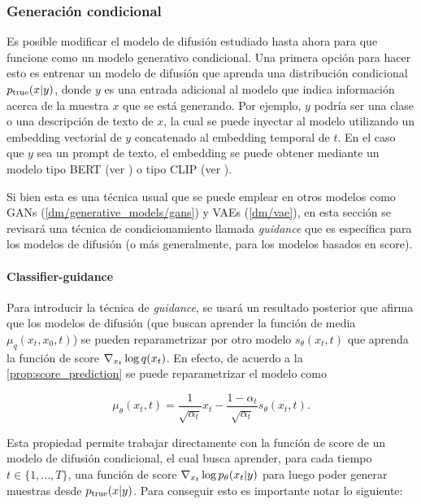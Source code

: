 \subsubsection{Generación condicional}

Es posible modificar el modelo de difusión estudiado hasta ahora para que funcione como un modelo generativo condicional. Una primera opción para hacer esto es entrenar un modelo de difusión que aprenda una distribución condicional $p_{\operatorname{true}}(x|y)$, donde $y$ es una entrada adicional al modelo que indica información acerca de la muestra $x$ que se está generando. Por ejemplo, $y$ podría ser una clase o una descripción de texto de $x$, la cual se puede inyectar al modelo utilizando un embedding vectorial de $y$ concatenado al embedding temporal de $t$. En el caso que $y$ sea un prompt de texto, el embedding se puede obtener mediante un modelo tipo BERT (ver \cite{devlin2019bertpretrainingdeepbidirectional}) o tipo CLIP (ver \cite{radford2021learningtransferablevisualmodels}).

Si bien esta es una técnica usual que se puede emplear en otros modelos como GANs (\autoref{dm/generative_models/gans}) y VAEs (\autoref{dm/vae}), en esta sección se revisará una técnica de condicionamiento llamada \textit{guidance} que es específica para los modelos de difusión (o más generalmente, para los modelos basados en score).

\paragraph{Classifier-guidance}

Para introducir la técnica de \textit{guidance}, se usará un resultado posterior que afirma que los modelos de difusión (que buscan aprender la función de media $\mu_q(x_t,x_0,t)$) se pueden reparametrizar por otro modelo $s_\theta(x_t,t)$ que aprenda la función de score $\nabla_{x_t} \log q(x_t)$. En efecto, de acuerdo a la \autoref{prop:score_prediction} se puede reparametrizar el modelo como

\begin{equation*}
    \label{eq:score_mean_relationship}
    \mu_\theta(x_t,t) = \frac{1}{\sqrt{\alpha_t}}x_t - \frac{1-\alpha_t}{\sqrt{\alpha_t}}s_\theta(x_t,t).
\end{equation*}

Esta propiedad permite trabajar directamente con la función de score de un modelo de difusión condicional, el cual busca aprender, para cada tiempo $t\in\{1,\ldots,T\}$, una función de score $\nabla_{x_t} \log p_\theta(x_t|y)$ para luego poder generar muestras desde $p_{\operatorname{true}}(x|y)$. Para conseguir esto es importante notar lo siguiente:

